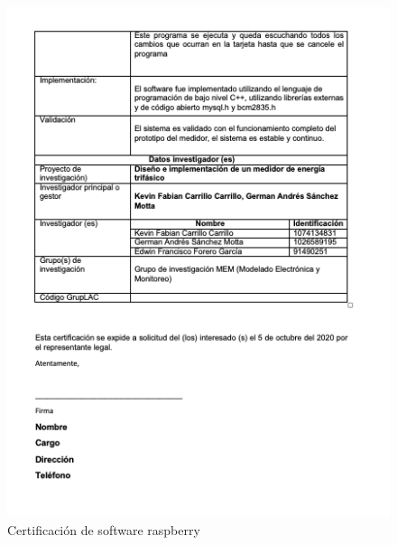 \begin{appendix}
\begin{figure}[H]
    \includegraphics[width = 14cm]{Anexos/raspberry-2.png}
    \caption{Certificación de software raspberry} 
    \label{fig:raspberry2}
\end{figure}


\end{appendix}
